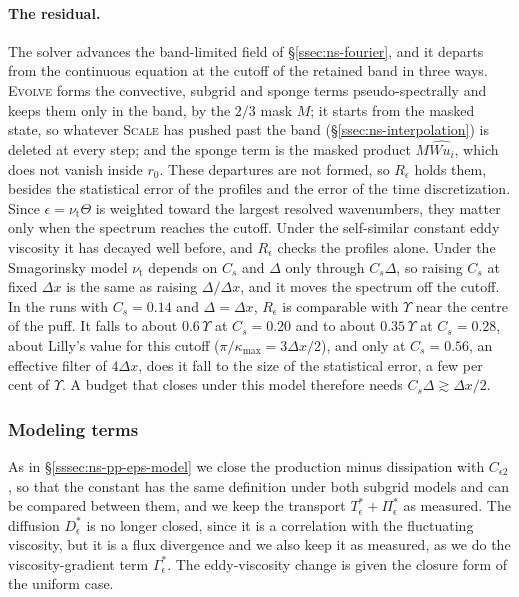 \documentclass{article}
\begin{document}
\paragraph{The residual.}
The solver advances the band-limited field of \S\ref{ssec:ns-fourier}, and it
departs from the continuous equation at the cutoff of the retained band in
three ways. \textsc{Evolve} forms the convective, subgrid and sponge terms
pseudo-spectrally and keeps them only in the band, by the $2/3$ mask $M$; it
starts from the masked state, so whatever \textsc{Scale} has pushed past the
band (\S\ref{ssec:ns-interpolation}) is deleted at every step; and the sponge
term is the masked product $M \widehat{W u_i}$, which does not vanish inside
$r_0$. These departures are not formed, so $R_\epsilon$ holds them, besides
the statistical error of the profiles and the error of the time
discretization. Since $\epsilon = \nu_{\mathrm{t}} \Theta$ is weighted toward
the largest resolved wavenumbers, they matter only when the spectrum reaches
the cutoff. Under the self-similar constant eddy viscosity it has decayed
well before, and $R_\epsilon$ checks the profiles alone. Under the
Smagorinsky model $\nu_{\mathrm{t}}$ depends on $C_s$ and $\Delta$ only through
$C_s \Delta$, so raising $C_s$ at fixed $\Delta x$ is the same as raising
$\Delta/\Delta x$, and it moves the spectrum off the cutoff. In the runs with
$C_s = 0.14$ and $\Delta = \Delta x$, $R_\epsilon$ is comparable with
$\Upsilon$ near the centre of the puff. It falls to about $0.6\,\Upsilon$ at
$C_s = 0.20$ and to about $0.35\,\Upsilon$ at $C_s = 0.28$, about Lilly's
value for this cutoff ($\pi/\kappa_{\max} = 3\Delta x/2$), and only at
$C_s = 0.56$, an effective filter of $4\Delta x$, does it fall to the size of
the statistical error, a few per cent of $\Upsilon$. A budget that closes
under this model therefore needs $C_s \Delta \gtrsim \Delta x/2$.

\subsubsection{Modeling terms}\label{sssec:ns-pp-eps-smag-model}
As in \S\ref{sssec:ns-pp-eps-model} we close the production minus
dissipation with $C_{\epsilon 2}$, so that the constant has the same
definition under both subgrid models and can be compared between them, and
we keep the transport $T_\epsilon^* + \Pi_\epsilon^*$ as measured. The
diffusion $D_\epsilon^*$ is no longer closed, since it is a correlation with
the fluctuating viscosity, but it is a flux divergence and we also keep it as
measured, as we do the viscosity-gradient term $\Gamma_\epsilon^*$. The
eddy-viscosity change is given the closure form of the uniform case.
\end{document}

